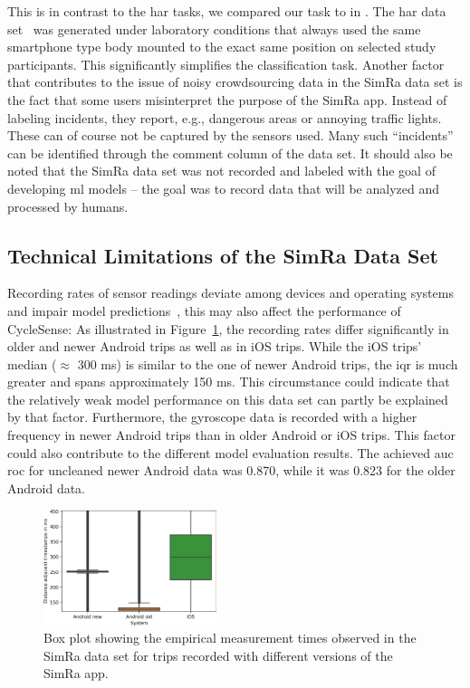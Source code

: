 This is in contrast to the \ac{har} tasks, we compared our task to in .
The \ac{har} data set~\cite{anguita2013public} was generated under laboratory conditions that always used the same smartphone type body mounted to the exact same position on selected study participants.
This significantly simplifies the classification task.
Another factor that contributes to the issue of noisy crowdsourcing data in the SimRa data set is the fact that some users misinterpret the purpose of the SimRa app.
Instead of labeling incidents, they report, e.g., dangerous areas or annoying traffic lights.
These can of course not be captured by the sensors used.
Many such ``incidents'' can be identified through the comment column of the data set.
It should also be noted that the SimRa data set was not recorded and labeled with the goal of developing \ac{ml} models -- the goal was to record data that will be analyzed and processed by humans.

\subsection{Technical Limitations of the SimRa Data Set}
\label{subsec:technical_limitations_of_the_simra_data_set}
Recording rates of sensor readings deviate among devices and operating systems and impair model predictions~\cite{stisen2015smart}, this may also affect the performance of CycleSense:
As illustrated in Figure~\ref{fig:emp-measurements}, the recording rates differ significantly in older and newer Android trips as well as in iOS trips.
While the iOS trips' median ($\approx$ 300 ms) is similar to the one of newer Android trips, the \ac{iqr} is much greater and spans approximately 150 ms.
This circumstance could indicate that the relatively weak model performance on this data set can partly be explained by that factor.
Furthermore, the gyroscope data is recorded with a higher frequency in newer Android trips than in older Android or iOS trips.
This factor could also contribute to the different model evaluation results.
The achieved \ac{auc} \ac{roc} for uncleaned newer Android data was 0.870, while it was 0.823 for the older Android data.

\begin{figure}%
	\centering
	\includegraphics[width=0.45\textwidth]{fig/empirical_measurements.png}
	\caption{Box plot showing the empirical measurement times observed in the SimRa data set for trips recorded with different versions of the SimRa app.}
	\label{fig:emp-measurements}
\end{figure}

